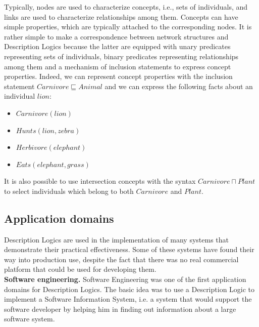 \documentclass[a4paper, 11pt, oneside]{elsarticle}
\begin{document}
Typically, nodes are used to characterize concepts, i.e., sets of individuals, and links are used to characterize relationships among them.
Concepts can have simple properties, which are typically attached to the corresponding nodes.
It is rather simple to make a correspondence between network structures and Description Logics because the latter are equipped with unary predicates representing sets of individuals, binary predicates representing relationships among them and a mechanism of inclusion statements to express concept properties.
Indeed, we can represent concept properties with the inclusion statement $Carnivore \sqsubseteq Animal$ and we can express the following facts about an individual $lion$: 

\begin{itemize}
	\item $Carnivore(lion)$
	\item $Hunts(lion, zebra)$
	\item $Herbivore(elephant)$
	\item $Eats(elephant, grass)$
\end{itemize}

It is also possible to use intersection concepts with the syntax $Carnivore \sqcap Plant$ to select individuals which belong to both $Carnivore$ and $Plant$.

\newpage

\subsection{Application domains}
Description Logics are used in the implementation of many systems that demonstrate their practical effectiveness. Some of these systems have found their way into production use, despite the fact that there was no real commercial platform that could be used for developing them.\\

\textbf{Software engineering.} Software Engineering was one of the first application domains for Description Logics. The basic idea was to use a Description Logic to implement a Software Information System, i.e. a system that would support the software developer by helping him in finding out information about a large software system.\\
\end{document}
